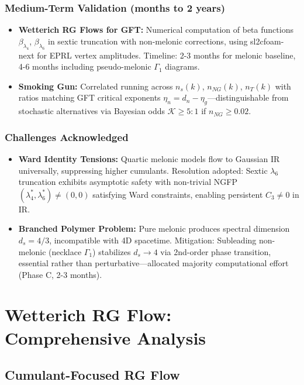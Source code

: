 \documentclass[12pt,a4paper]{article}
\begin{document}
\subsubsection{Medium-Term Validation (months to 2 years)}

\begin{itemize}
\item \textbf{Wetterich RG Flows for GFT:} Numerical computation of beta functions \(\beta_{\lambda_4}\), \(\beta_{\lambda_6}\) in sextic truncation with non-melonic corrections, using sl2cfoam-next for EPRL vertex amplitudes. Timeline: 2-3 months for melonic baseline, 4-6 months including pseudo-melonic \(\Gamma_1\) diagrams.

\item \textbf{Smoking Gun:} Correlated running across \(n_s(k)\), \(n_{NG}(k)\), \(n_T(k)\) with ratios matching GFT critical exponents \(\eta_n = d_n - \eta_g\)—distinguishable from stochastic alternatives via Bayesian odds \(\mathcal{K} \geq 5:1\) if \(n_{NG} \geq 0.02\).
\end{itemize}

\subsubsection{Challenges Acknowledged}

\begin{itemize}
\item \textbf{Ward Identity Tensions:} Quartic melonic models flow to Gaussian IR universally, suppressing higher cumulants. Resolution adopted: Sextic \(\lambda_6\) truncation exhibits asymptotic safety with non-trivial NGFP \((\lambda_4^*, \lambda_6^*) \neq (0, 0)\) satisfying Ward constraints, enabling persistent \(C_3 \neq 0\) in IR.

\item \textbf{Branched Polymer Problem:} Pure melonic produces spectral dimension \(d_s = 4/3\), incompatible with 4D spacetime. Mitigation: Subleading non-melonic (necklace \(\Gamma_1\)) stabilizes \(d_s \to 4\) via 2nd-order phase transition, essential rather than perturbative—allocated majority computational effort (Phase C, 2-3 months).
\end{itemize}

\section{Wetterich RG Flow: Comprehensive Analysis}

\subsection{Cumulant-Focused RG Flow}
\end{document}
